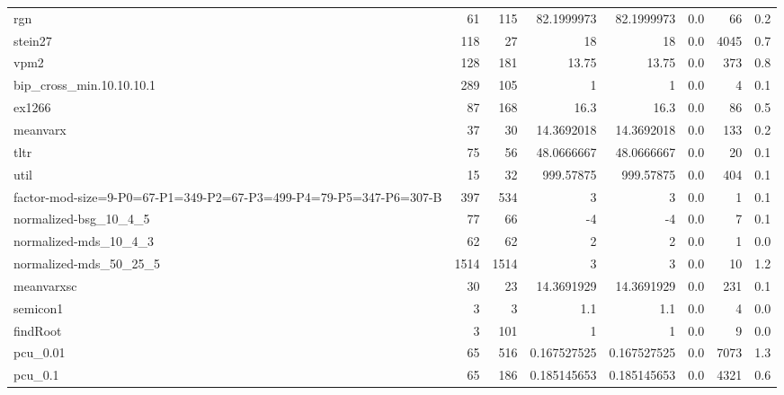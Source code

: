 \documentclass[leqno]{article}
\begin{document}
\begin{center}
\begin{supertabular*}{\textwidth}{@{\extracolsep{\fill}}lrrrrrrr@{}}
rgn                 &     61 &    115 &       82.1999973 &       82.1999973 &    0.0 &        66 &      0.2\\
stein27             &    118 &     27 &               18 &               18 &    0.0 &      4045 &      0.7\\
vpm2                &    128 &    181 &            13.75 &            13.75 &    0.0 &       373 &      0.8\\
bip\_cross\_min.10.10.10.1 &    289 &    105 &                1 &                1 &    0.0 &         4 &      0.1\\
ex1266              &     87 &    168 &             16.3 &             16.3 &    0.0 &        86 &      0.5\\
meanvarx            &     37 &     30 &       14.3692018 &       14.3692018 &    0.0 &       133 &      0.2\\
tltr                &     75 &     56 &       48.0666667 &       48.0666667 &    0.0 &        20 &      0.1\\
util                &     15 &     32 &        999.57875 &        999.57875 &    0.0 &       404 &      0.1\\
factor-mod-size=9-P0=67-P1=349-P2=67-P3=499-P4=79-P5=347-P6=307-B &    397 &    534 &                3 &                3 &    0.0 &         1 &      0.1\\
normalized-bsg\_10\_4\_5 &     77 &     66 &               -4 &               -4 &    0.0 &         7 &      0.1\\
normalized-mds\_10\_4\_3 &     62 &     62 &                2 &                2 &    0.0 &         1 &      0.0\\
normalized-mds\_50\_25\_5 &   1514 &   1514 &                3 &                3 &    0.0 &        10 &      1.2\\
meanvarxsc          &     30 &     23 &       14.3691929 &       14.3691929 &    0.0 &       231 &      0.1\\
semicon1            &      3 &      3 &              1.1 &              1.1 &    0.0 &         4 &      0.0\\
findRoot            &      3 &    101 &                1 &                1 &    0.0 &         9 &      0.0\\
pcu\_0.01           &     65 &    516 &      0.167527525 &      0.167527525 &    0.0 &      7073 &      1.3\\
pcu\_0.1            &     65 &    186 &      0.185145653 &      0.185145653 &    0.0 &      4321 &      0.6\\

\end{supertabular*}
\end{center}
\end{document}
